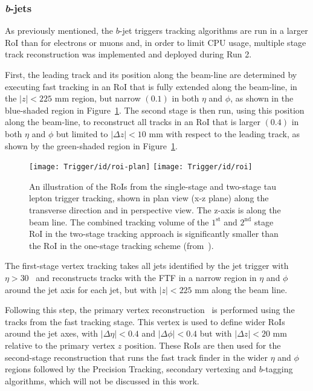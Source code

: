 				\subsubsection*{\emph{b}-jets}
				\label{par:bjets_perf}

					As previously mentioned, the $b$-jet triggers tracking algorithms are run in a larger \ac{RoI} than for electrons or muons and, in order to limit \ac{CPU} usage, multiple stage track reconstruction was implemented and deployed during Run 2.

					First, the leading track and its position along the beam-line are determined by executing fast tracking in an \ac{RoI} that is fully extended along the beam-line, in the $|z|<225$ mm region, but narrow $(0.1)$ in both $\eta$ and $\phi$, as shown in the blue-shaded region in Figure~\ref{fig:idroi}. The second stage is then run, using this position along the beam-line, to reconstruct all tracks in an \ac{RoI} that is larger $(0.4)$ in both $\eta$ and $\phi$ but limited to $|\Delta z|<10$ mm with respect to the leading track, as shown by the green-shaded region in Figure~\ref{fig:idroi}.

					\begin{figure}[!htb]
						\centering
						\texttt{[image: Trigger/id/roi-plan]}
						\texttt{[image: Trigger/id/roi]}
						\caption{An illustration of the \ac{RoI}s from the single-stage and two-stage tau lepton trigger tracking, shown in plan view (x-z plane) along the transverse direction and in perspective view. The z-axis is along the beam line. The combined tracking volume of the $1^{\mathrm{st}}$ and $2^{\mathrm{nd}}$ stage \ac{RoI} in the two-stage tracking approach is significantly smaller than the \ac{RoI} in the one-stage tracking scheme (from~\cite{ATLASTrigger2015}).}
						\label{fig:idroi}
					\end{figure}

					The first-stage vertex tracking takes all jets identified by the jet trigger with $\eta > 30$ \GeV\ and reconstructs tracks with the \ac{FTF} in a narrow region in $\eta$ and $\phi$ around the jet axis for each jet, but with $|z|<225$ mm along the beam line.
					
					Following this step, the primary vertex reconstruction~\cite{ATLAS-CONF-2010-069} is performed using the tracks from the fast tracking stage. This vertex is used to define wider \ac{RoI}s around
					the jet axes, with $|\Delta\eta|<0.4$ and $|\Delta\phi|<0.4$ but with $|\Delta z|<20$ mm relative to the primary vertex $z$ position. These \ac{RoI}s are then used for the second-stage 
					reconstruction that runs the fast track finder in the wider $\eta$ and $\phi$ regions followed by the Precision Tracking, secondary vertexing and $b$-tagging algorithms, which will not be discussed in this work.

